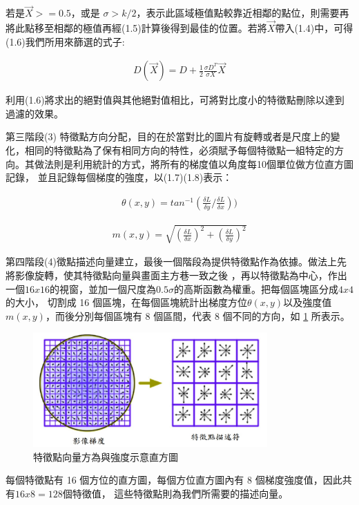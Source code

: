    
   若是$\vec{X} >= 0.5$，或是 $\sigma > k/2$，表示此區域極值點較靠近相鄰的點位，則需要再將此點移至相鄰的極值再經(1.5)計算後得到最佳的位置。若將$\vec{X}$帶入(1.4)中，可得(1.6)我們所用來篩選的式子:
   
\begin{align}
  D(\vec{X}) = D+\frac{1}{2} \frac{\sigma D^T}{\sigma X} \vec{X}
\end{align}      
   
   利用(1.6)將求出的絕對值與其他絕對值相比，可將對比度小的特徵點刪除以達到過濾的效果。
   
   第三階段(3) 特徵點方向分配，目的在於當對比的圖片有旋轉或者是尺度上的變化，相同的特徵點為了保有相同方向的特性，必須賦予每個特徵點一組特定的方向。其做法則是利用統計的方式，將所有的梯度值以角度每10個單位做方位直方圖記錄，
並且記錄每個梯度的強度，以(1.7)(1.8)表示：

\begin{align}
	\theta (x,y)= tan^{-1}(\frac{\delta L}{\delta y}/\frac{\delta L}{\delta x}))
\end{align}      
   
\begin{align}
	m(x,y) = \sqrt{(\frac{\delta L}{\delta x})^2+(\frac{\delta L}{\delta y})^2}
\end{align}


   第四階段(4)徵點描述向量建立，最後一個階段為提供特徵點作為依據。做法上先將影像旋轉，使其特徵點向量與畫面主方巷一致之後
   ，再以特徵點為中心，作出一個$16 x 16$的視窗，並加一個尺度為$0.5\sigma$的高斯函數為權重。把每個區塊區分成$4 x 4$的大小，
   切割成 16 個區塊，在每個區塊統計出梯度方位$ \theta (x,y)$以及強度值$m(x,y)$，而後分別每個區塊有 8 個區間，代表 8 
   個不同的方向，如 \ref{fig:SIFT Histogram} 所表示。

\begin{figure}
\begin{center}
  \includegraphics[width=0.8\textwidth]{figures/SIFT_histogram.jpg}
  \caption{特徵點向量方為與強度示意直方圖}
  \label{fig:SIFT Histogram}
\end{center}
\end{figure}  

     每個特徵點有 16 個方位的直方圖，每個方位直方圖內有 8 個梯度強度值，因此共有$ 16 x 8 = 128$個特徵值，
     這些特徵點則為我們所需要的描述向量。




